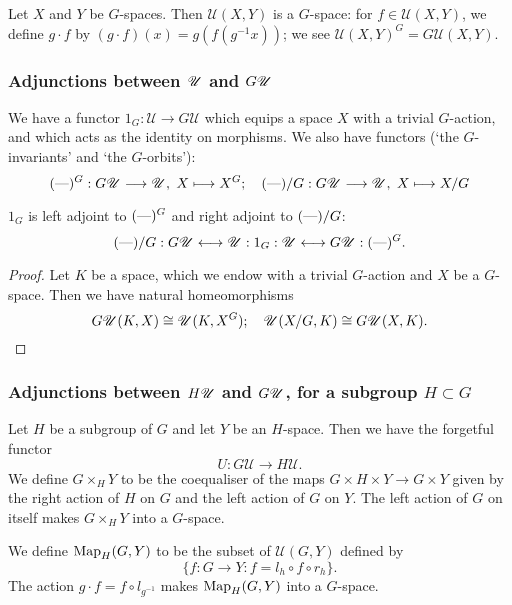 \documentclass[11pt]{article}
\begin{document}
Let $X$ and $Y$ be $G$-spaces. Then $\mathscr{U}(X,Y)$ is a $G$-space: for $f\in\mathscr{U}(X,Y)$, we define $g\cdot f$ by  $(g\cdot f)(x)=g(f(g^{-1}x))$; we see $\mathscr{U}(X,Y)^G=G\mathscr{U}(X,Y)$.
\subsubsection*{Adjunctions between $\mathscr{U}$ and $G\mathscr{U}$}
We have a functor $1_G:\mathscr{U}\to G\mathscr{U}$ which equips a space $X$ with a trivial $G$-action, and which acts as the identity on morphisms.
We also have functors (`the $G$-invariants' and `the $G$-orbits'):
\[(\textup{---})^G:G\mathscr{U}\longrightarrow\mathscr{U}, \hspace{3pt} X\longmapsto X^G; \hspace{10pt}
(\textup{---})/G:G\mathscr{U}\longrightarrow\mathscr{U}, \hspace{3pt} X\longmapsto X/G\]
\begin{thm*} $1_G$ is left adjoint to $(\textup{---})^G$ and right adjoint to $(\textup{---})/G$:
\[(\textup{---})/G:G\mathscr{U}\longleftrightarrow\mathscr{U}: 1_G:\mathscr{U}\longleftrightarrow G\mathscr{U}: (\textup{---})^G.\]
\end{thm*}
\begin{proof}  Let $K$ be a space, which we endow with a trivial $G$-action and $X$ be a $G$-space. Then we have natural homeomorphisms
\[G\mathscr{U}(K,X)\cong\mathscr{U}(K,X^G);\hspace{10pt}
\mathscr{U}(X/G,K)\cong G\mathscr{U}(X,K).\qedhere\]
\end{proof}
\subsubsection*{Adjunctions between $H\mathscr{U}$ and $G\mathscr{U}$, for a subgroup $H\subset G$}
Let $H$ be a subgroup of $G$ and let $Y$ be an $H$-space. Then we have the forgetful functor
\[U:G\mathscr{U}\to H\mathscr{U}.\]
We define $G\times_H Y$ to be the coequaliser of the maps $G\times H\times Y\to G\times Y$ given by the right action of $H$ on $G$ and the left action of $G$ on $Y$. The left action of $G$ on itself makes $G\times_H Y$ into a $G$-space.

We define $\textup{Map}_H(G,Y)$ to be the subset of $\mathscr{U}(G,Y)$ defined by
\[\{f:G\to Y: f=l_h\circ f\circ r_h\}.\]
The action $g\cdot f=f\circ l_{g^{-1}}$ makes $\textup{Map}_H(G,Y)$ into a $G$-space.
\end{document}
